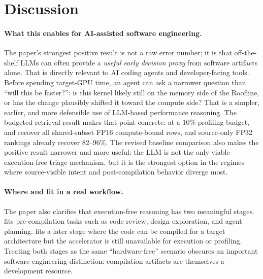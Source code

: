 \section{Discussion}
\label{sec:discussion}

\paragraph{What this enables for AI-assisted software engineering.}
The paper's strongest positive result is not a raw error number; it is that off-the-shelf LLMs can often provide a \emph{useful early decision proxy} from software artifacts alone.
That is directly relevant to AI coding agents and developer-facing tools.
Before spending target-GPU time, an agent can ask a narrower question than ``will this be faster?'':
is this kernel likely still on the memory side of the Roofline, or has the change plausibly shifted it toward the compute side?
That is a simpler, earlier, and more defensible use of LLM-based performance reasoning.
The budgeted retrieval result makes that point concrete:
at a 10\% profiling budget, \sourcesass \gptfivefour and \opus recover all shared-subset FP16 compute-bound rows, and source-only FP32 rankings already recover 82--96\%.
The revised baseline comparison also makes the positive result narrower and more useful:
the LLM is not the only viable execution-free triage mechanism, but it is the strongest option in the regimes where source-visible intent and post-compilation behavior diverge most.

\paragraph{Where \sourceonly and \sourcesass fit in a real workflow.}
The paper also clarifies that execution-free reasoning has two meaningful stages.
\sourceonly fits pre-compilation tasks such as code review, design exploration, and agent planning.
\sourcesass fits a later stage where the code can be compiled for a target architecture but the accelerator is still unavailable for execution or profiling.
Treating both stages as the same ``hardware-free'' scenario obscures an important software-engineering distinction: compilation artifacts are themselves a development resource.

